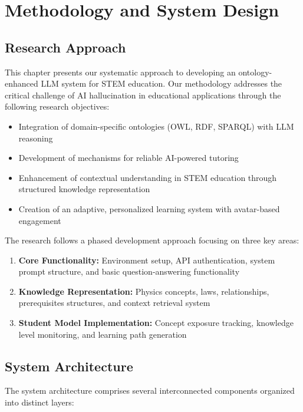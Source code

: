 \chapter{Methodology and System Design}
\label{chap:methodology}

\section{Research Approach}
\label{sec:research-approach}
This chapter presents our systematic approach to developing an ontology-enhanced LLM system for STEM education. Our methodology addresses the critical challenge of AI hallucination in educational applications through the following research objectives:

\begin{itemize}
    \item Integration of domain-specific ontologies (OWL, RDF, SPARQL) with LLM reasoning 
    \item Development of mechanisms for reliable AI-powered tutoring 
    \item Enhancement of contextual understanding in STEM education through structured knowledge representation
    \item Creation of an adaptive, personalized learning system with avatar-based engagement
\end{itemize}

The research follows a phased development approach focusing on three key areas:
\begin{enumerate}
    \item \textbf{Core Functionality:} Environment setup, API authentication, system prompt structure, and basic question-answering functionality
    \item \textbf{Knowledge Representation:} Physics concepts, laws, relationships, prerequisites structures, and context retrieval system
    \item \textbf{Student Model Implementation:} Concept exposure tracking, knowledge level monitoring, and learning path generation
\end{enumerate}

\section{System Architecture}
\label{sec:system-architecture}

The system architecture comprises several interconnected components organized into distinct layers:

